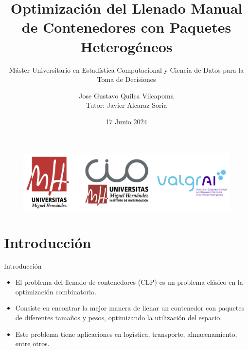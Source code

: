 \documentclass[handout]{beamer}
\author[Gustavo Quilca]{Jose Gustavo Quilca Vilcapoma
\\
\small Tutor: Javier Alcaraz Soria}
\title{Optimización del Llenado Manual de Contenedores con Paquetes Heterogéneos}
\subtitle{Máster Universitario en Estadística Computacional y Ciencia de Datos para la Toma de Decisiones}
\institute[CIO - UMH]{
    Instituto Centro de Investigación Operativa \\
    Universidad Miguel Hernández
}
\date{\small 17 Junio 2024}
\begin{document}
\begin{frame}
    \titlepage
    \vspace*{-0.6cm}
    \begin{figure}[htpb]
        \begin{center}
            \includegraphics[keepaspectratio, scale=0.04]{pic/logos.png}
        \end{center}
    \end{figure}
\end{frame}

\begin{frame}
    \tableofcontents[sectionstyle=show,
        subsectionstyle=show/shaded/hide,
        subsubsectionstyle=show/shaded/hide]
\end{frame}

\section{Introducción}

\begin{frame}{Introducción}
    \begin{itemize}[<+-| alert@+>] %
        \item El problema del llenado de contenedores (CLP) es un
              problema clásico en la optimización combinatoria.
        \item Consiste en encontrar la mejor manera de llenar un contenedor con paquetes de diferentes tamaños y pesos, optimizando la utilización del espacio.
        \item Este problema tiene aplicaciones en logística, transporte,
              almacenamiento, entre otros.
    \end{itemize}
\end{frame}
\end{document}
